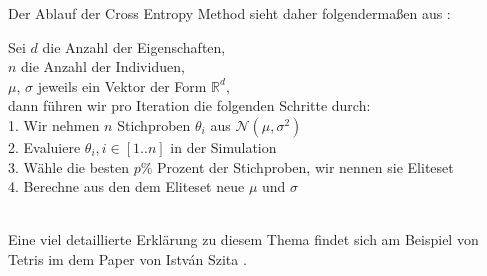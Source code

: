             \noindent
            Der Ablauf der Cross Entropy Method sieht daher folgendermaßen aus \cite{cem-blog}:\\

                \begin{mdframed}
                    Sei $d$ die Anzahl der Eigenschaften,\\
                    \hspace*{5mm} $n$ die Anzahl der Individuen,\\
                    \hspace*{5mm} $\mu$, $\sigma$ jeweils ein Vektor der Form $\mathbb{R}^{d}$,\\
                    \hspace*{5mm} dann führen wir pro Iteration die folgenden Schritte durch: \\

                    \hspace*{8mm} 1. Wir nehmen $n$ Stichproben $\theta_i$ aus $\mathcal{N}(\mu, \sigma^{2})$ \\
                    \hspace*{12mm} 2. Evaluiere $\theta_i, i \in [1..n]$ in der Simulation\\
                    \hspace*{12mm} 3. Wähle die besten $p\%$ Prozent der Stichproben, wir nennen sie Eliteset\\
                    \hspace*{12mm} 4. Berechne aus den dem Eliteset neue $\mu$ und $\sigma$
                \end{mdframed}
            \hfill \\
            Eine viel detaillierte Erklärung zu diesem Thema findet sich am Beispiel von Tetris im dem Paper von István Szita \cite{cem}.
